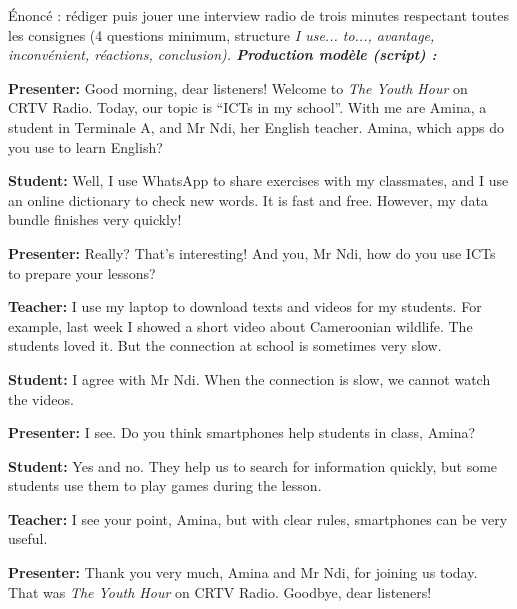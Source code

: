 \documentclass[11pt]{article}
\newcommand{\eng}[1]{\ifmmode\text{\textit{#1}}\else\begingroup\selectlanguage{english}\itshape #1\endgroup\fi}
\begin{document}
\begin{exoresolu}
Énoncé : rédiger puis jouer une interview radio de trois minutes respectant toutes les consignes (4 questions minimum, structure \eng{I use... to...}, avantage, inconvénient, réactions, conclusion).
\tcblower
\textbf{Production modèle (script) :}

\textbf{Presenter:} Good morning, dear listeners! Welcome to \emph{The Youth Hour} on CRTV Radio. Today, our topic is “ICTs in my school”. With me are Amina, a student in Terminale A, and Mr Ndi, her English teacher. Amina, which apps do you use to learn English?

\textbf{Student:} Well, I use WhatsApp to share exercises with my classmates, and I use an online dictionary to check new words. It is fast and free. However, my data bundle finishes very quickly!

\textbf{Presenter:} Really? That's interesting! And you, Mr Ndi, how do you use ICTs to prepare your lessons?

\textbf{Teacher:} I use my laptop to download texts and videos for my students. For example, last week I showed a short video about Cameroonian wildlife. The students loved it. But the connection at school is sometimes very slow.

\textbf{Student:} I agree with Mr Ndi. When the connection is slow, we cannot watch the videos.

\textbf{Presenter:} I see. Do you think smartphones help students in class, Amina?

\textbf{Student:} Yes and no. They help us to search for information quickly, but some students use them to play games during the lesson.

\textbf{Teacher:} I see your point, Amina, but with clear rules, smartphones can be very useful.

\textbf{Presenter:} Thank you very much, Amina and Mr Ndi, for joining us today. That was \emph{The Youth Hour} on CRTV Radio. Goodbye, dear listeners!


\end{exoresolu}
\end{document}
